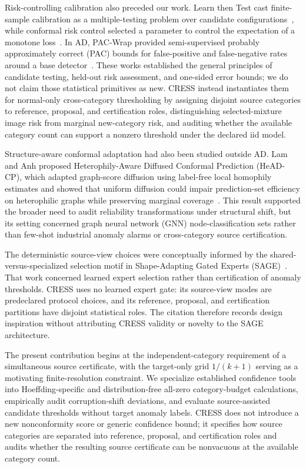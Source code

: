 Risk-controlling calibration also preceded our work. Learn then Test cast finite-sample calibration as a multiple-testing problem over candidate configurations~\cite{angelopoulos2021learntest}, while conformal risk control selected a parameter to control the expectation of a monotone loss~\cite{angelopoulos2024crc}. In AD, PAC-Wrap provided semi-supervised probably approximately correct (PAC) bounds for false-positive and false-negative rates around a base detector~\cite{li2022pacwrap}. These works established the general principles of candidate testing, held-out risk assessment, and one-sided error bounds; we do not claim those statistical primitives as new. CRESS instead instantiates them for normal-only cross-category thresholding by assigning disjoint source categories to reference, proposal, and certification roles, distinguishing selected-mixture image risk from marginal new-category risk, and auditing whether the available category count can support a nonzero threshold under the declared iid model.

Structure-aware conformal adaptation had also been studied outside AD\@. Lam and Anh proposed Heterophily-Aware Diffused Conformal Prediction (HeAD-CP), which adapted graph-score diffusion using label-free local homophily estimates and showed that uniform diffusion could impair prediction-set efficiency on heterophilic graphs while preserving marginal coverage~\cite{lam2026headcp}. This result supported the broader need to audit reliability transformations under structural shift, but its setting concerned graph neural network (GNN) node-classification sets rather than few-shot industrial anomaly alarms or cross-category source certification.

The deterministic source-view choices were conceptually informed by the shared-versus-specialized selection motif in Shape-Adapting Gated Experts (SAGE)~\cite{Thai_2026_CVPR}. That work concerned learned expert selection rather than certification of anomaly thresholds. CRESS uses no learned expert gate: its source-view modes are predeclared protocol choices, and its reference, proposal, and certification partitions have disjoint statistical roles. The citation therefore records design inspiration without attributing CRESS validity or novelty to the SAGE architecture.

The present contribution begins at the independent-category requirement of a simultaneous source certificate, with the target-only grid $1/(k{+}1)$ serving as a motivating finite-resolution constraint. We specialize established confidence tools into Hoeffding-specific and distribution-free all-zero category-budget calculations, empirically audit corruption-shift deviations, and evaluate source-assisted candidate thresholds without target anomaly labels. CRESS does not introduce a new nonconformity score or generic confidence bound; it specifies how source categories are separated into reference, proposal, and certification roles and audits whether the resulting source certificate can be nonvacuous at the available category count.
